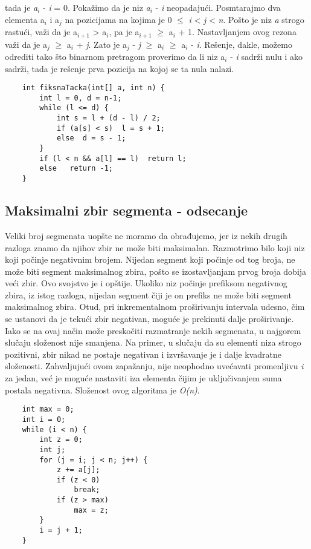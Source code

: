 \documentclass{article}
\begin{document}
tada je \textit{a$_i$} - \textit{i} = 0. Pokažimo da je niz \textit{a$_i$} - \textit{i} neopadajući. Posmtarajmo dva
elementa a$_i$
i a$_j$ na pozicijama na kojima je 0 $\leq$ \textit{i} < \textit{j} < \textit{n}. Pošto je niz \textit{a} strogo
rastući, važi da je a$_{i+1}$ > a$_i$, pa je a$_{i+1}$ $\geq$ a$_i$ + 1. Nastavljanjem ovog rezona važi da je
a$_j$ $\geq$ a$_i$ + \textit{j}. Zato je a$_j$ - \textit{j} $\geq$  a$_i$ $\geq$ a$_i$ - \textit{i}.
Rešenje, dakle, možemo odrediti tako što binarnom pretragom proverimo da li
niz a$_i$ - \textit{i} sadrži nulu i ako sadrži, tada je rešenje prva pozicija na kojoj se ta
nula nalazi.
\begin{lstlisting}
    int fiksnaTacka(int[] a, int n) {
        int l = 0, d = n-1;
        while (l <= d) {
            int s = l + (d - l) / 2;
            if (a[s] < s)  l = s + 1;
            else  d = s - 1;
        }
        if (l < n && a[l] == l)  return l;
        else   return -1;
    }
\end{lstlisting}

\subsection{Maksimalni zbir segmenta - odsecanje}
Veliki broj segmenata uopšte ne moramo da obrađujemo, jer iz nekih drugih
razloga znamo da njihov zbir ne može biti maksimalan.
\newline Razmotrimo bilo koji niz koji počinje negativnim brojem. Nijedan segment
koji počinje od tog broja, ne može biti segment maksimalnog zbira, pošto se
izostavljanjam prvog broja dobija veći zbir. Ovo svojstvo je i opštije. Ukoliko
niz počinje prefiksom negativnog zbira, iz istog razloga, nijedan segment čiji je
on prefiks ne može biti segment maksimalnog zbira. Otud, pri inkrementalnom
proširivanju intervala udesno, čim se ustanovi da je tekući zbir negativan, moguće
je prekinuti dalje proširivanje. Iako se na ovaj način može preskočiti razmatranje nekih segmenata, u najgorem
slučaju složenost nije smanjena. Na primer, u slučaju da su elementi niza strogo
pozitivni, zbir nikad ne postaje negativan i izvršavanje je i dalje kvadratne
složenosti. Zahvaljujući ovom zapažanju, nije neophodno uvećavati promenljivu \textit{i} za jedan,
već je moguće nastaviti iza elementa čijim je uključivanjem suma postala negativna. Složenost ovog algoritma je \textit{O(n)}. 
\begin{lstlisting}
    int max = 0;
    int i = 0;
    while (i < n) {
        int z = 0;
        int j;
        for (j = i; j < n; j++) {
            z += a[j];
            if (z < 0)
                break;
            if (z > max)
                max = z;
        }
        i = j + 1;
    }
\end{lstlisting}
\end{document}
